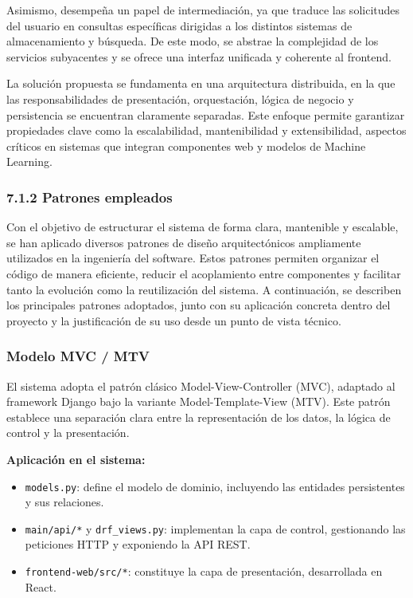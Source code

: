 Asimismo, desempeña un papel de intermediación, ya que traduce las solicitudes del usuario 
en consultas específicas dirigidas a los distintos sistemas de almacenamiento y búsqueda. 
De este modo, se abstrae la complejidad de los servicios subyacentes y se ofrece una interfaz unificada
 y coherente al frontend.

La solución propuesta se fundamenta en una arquitectura distribuida, en la que
las responsabilidades de presentación, orquestación, lógica de negocio y
persistencia se encuentran claramente separadas. Este enfoque permite garantizar
propiedades clave como la escalabilidad, mantenibilidad y extensibilidad,
aspectos críticos en sistemas que integran componentes web y modelos de Machine
Learning.
\subsubsection{7.1.2 Patrones empleados}
Con el objetivo de estructurar el sistema de forma clara, mantenible y
escalable, se han aplicado diversos patrones de diseño arquitectónicos
ampliamente utilizados en la ingeniería del software. Estos patrones permiten
organizar el código de manera eficiente, reducir el acoplamiento entre
componentes y facilitar tanto la evolución como la reutilización del sistema.
A continuación, se describen los principales patrones adoptados, junto con su
aplicación concreta dentro del proyecto y la justificación de su uso desde un
punto de vista técnico.


\subsubsection{Modelo MVC / MTV}

El sistema adopta el patrón clásico Model-View-Controller (MVC), adaptado al
framework Django bajo la variante Model-Template-View (MTV). Este patrón
establece una separación clara entre la representación de los datos, la lógica
de control y la presentación.

\textbf{Aplicación en el sistema:}
\begin{itemize}
\item \texttt{models.py}: define el modelo de dominio, incluyendo las entidades
persistentes y sus relaciones.
\item \texttt{main/api/*} y \texttt{drf\_views.py}: implementan la capa de
control, gestionando las peticiones HTTP y exponiendo la API REST.
\item \texttt{frontend-web/src/*}: constituye la capa de presentación,
desarrollada en React.
\end{itemize}

